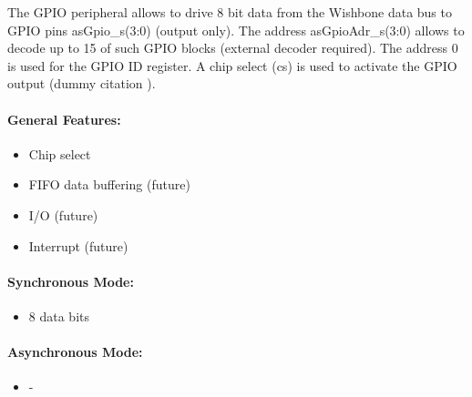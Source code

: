 The GPIO peripheral allows to drive 8 bit data from the Wishbone data bus to GPIO pins asGpio\_s(3:0) (output only). The address asGpioAdr\_s(3:0) allows to decode up to 15 of such GPIO blocks (external decoder required). The address 0 is used for the GPIO ID register. A chip select (cs) is used to activate the GPIO output (dummy citation \cite{lehm}).

\paragraph{General Features: }
\begin{itemize}
  \item Chip select
  \item FIFO data buffering (future)
  \item I/O (future)
  \item Interrupt (future)
\end{itemize}

\paragraph{Synchronous Mode: }
\begin{itemize}
  \item 8 data bits
\end{itemize}

\paragraph{Asynchronous Mode: }
\begin{itemize}
  \item -
\end{itemize}
